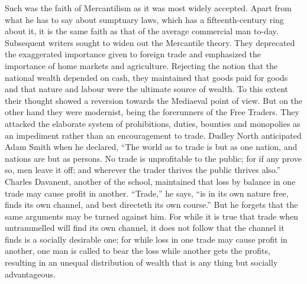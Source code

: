 \documentclass{book}
\begin{document}
Such was the faith of Mercantilism as it was most widely accepted. Apart from what he has to say about sumptuary laws, which has a fifteenth-century ring about it, it is the same faith as that of the average commercial man to-day. Subsequent writers sought to widen out the Mercantile theory. They deprecated the exaggerated importance given to foreign trade and emphasized the importance of home markets and agriculture. Rejecting the notion that the national wealth depended on cash, they maintained that goods paid for goods and that nature and labour were the ultimate source of wealth. To this extent their thought showed a reversion towards the Mediaeval point of view. But on the other hand they were modernist, being the forerunners of the Free Traders. They attacked the elaborate system of prohibitions, duties, bounties and monopolies as an impediment rather than an encouragement to trade. Dudley North anticipated Adam Smith when he declared, “The world as to trade is but as one nation, and nations are but as persons. No trade is unprofitable to the public; for if any prove so, men leave it off; and wherever the trader thrives the public thrives also.” Charles Davanent, another of the school, maintained that loss by balance in one trade may cause profit in another. “Trade,” he says, “is in its own nature free, finds its own channel, and best directeth its own course.” But he forgets that the same arguments may be turned against him. For while it is true that trade when untrammelled will find its own channel, it does not follow that the channel it finds is a socially desirable one; for while loss in one trade may cause profit in another, one man is called to bear the loss while another gets the profits, resulting in an unequal distribution of wealth that is any thing but socially advantageous.
\end{document}
